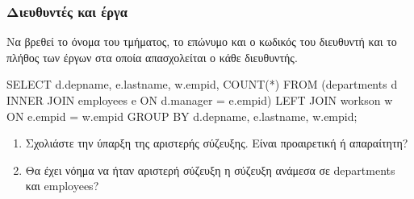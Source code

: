 \begin{frame}
\frametitle{Διευθυντές και έργα}
\begin{minipage}{\wE}
\begin{exampleblock}{\small Να βρεθεί το όνομα του τμήματος,
            το επώνυμο και ο κωδικός του διευθυντή και το πλήθος
            των έργων στα οποία απασχολείται ο κάθε διευθυντής.}
\pause
\en
\begin{SQL}
 SELECT d.depname, e.lastname, w.empid, COUNT(*)
   FROM  (departments d INNER JOIN employees e
                           ON d.manager = e.empid)
                         LEFT JOIN workson w
                           ON e.empid = w.empid  
GROUP BY d.depname, e.lastname, w.empid;
\end{SQL}
\end{exampleblock}
\vspace{0.2cm}
\begin{enumerate}
  \item Σχολιάστε την ύπαρξη της αριστερής σύζευξης.
        Είναι προαιρετική ή απαραίτητη?
  \item Θα έχει νόημα να ήταν αριστερή σύζευξη
        η σύζευξη ανάμεσα σε {\ra departments} και {\ra employees}?
\end{enumerate}

\end{minipage}
\end{frame}


